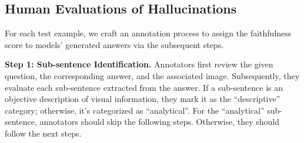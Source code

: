 \subsection{Human Evaluations of Hallucinations}

For each test example, we craft an annotation process to assign the faithfulness score to models' generated answers via the subsequent steps.

\vspace{.5em}
\noindent \textbf{Step 1: Sub-sentence Identification.}
Annotators first review the given question, the corresponding answer, and the associated image. Subsequently, they evaluate each sub-sentence extracted from the answer. If a sub-sentence is an objective description of visual information, they mark it as the ``descriptive'' category; otherwise, it's categorized as ``analytical''. For the  ``analytical'' sub-sentence, annotators should skip the following steps. Otherwise, they should follow the next steps. 



\begin{table}[t]
    \centering
    \caption{Comparison of recognizer LLMs' accuracy (\%) on identifying descriptive sub-sentences. 
    For LLaMA, we used two different prompt settings, either to input only the sub-sentence or both the sub-sentence and its context into the model (LLaMA-7B w/ context).
    }
    \label{tab:identifier}
    
\end{table}


